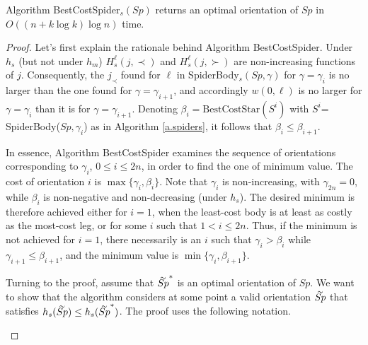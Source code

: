 \begin{theorem}
Algorithm BestCostSpider$_s (Sp)$ returns an optimal orientation of $Sp$ in $O((n + k \log k )\log n)$ time.
\end{theorem}
\begin{proof}
	Let's first explain the rationale behind Algorithm BestCostSpider.
	Under $h_s$ (but not under $h_m$) $H^{\ell}_s(j,\prec)$ and $H^{\ell}_s(j,\succ)$
	are non-increasing functions of $j$. Consequently,
	the $j_{\prec}$ found for $\ell$ in SpiderBody$_s (Sp,\gamma)$ for $\gamma=\gamma_i$
	is no larger than the one found for $\gamma=\gamma_{i+1}$, and 
	accordingly $w(0,\ell)$ is no larger for $\gamma=\gamma_i$
	than it is for $\gamma=\gamma_{i+1}$. Denoting 
	$\beta_i=\mbox{BestCostStar}(S^i)$ with $S^i$= SpiderBody($Sp,\gamma_i$)
	as in Algorithm \ref{a.spiders}, it follows that $\beta_i\leq \beta_{i+1}$.
	
	In essence, Algorithm BestCostSpider examines the sequence of orientations
	corresponding to $\gamma_i$, $0\leq i\leq 2n$, in order to
	find the one of minimum value. The cost of orientation $i$ is
    $\max\{\gamma_i,\beta_i\}$. Note that $\gamma_i$ is non-increasing,
    with $\gamma_{2n}=0$, while $\beta_i$ is non-negative and
    non-decreasing (under $h_s$). The desired minimum is therefore achieved either for $i=1$,
	when the least-cost body is at least as costly as the most-cost leg, or for some $i$
	such that $1< i \leq 2n$. 
Thus, if the minimum is not achieved for $i=1$, there necessarily is an $i$ such that 
$\gamma_i>\beta_i$ while $\gamma_{i+1}\leq \beta_{i+1}$, and the minimum value is 
$\min \{\gamma_i,\beta_{i+1}\}$.
	
Turning to the proof, assume that  $\tildeb{Sp}^*$ is an optimal orientation of $Sp$. 
We want to show that 
	the algorithm considers at some point a valid orientation $\tildeb{Sp}$ that satisfies 
	$h_s(\tildeb{Sp})\leq h_s(\tildeb{Sp}^*)$. The proof
	uses the following notation.
	\begin{itemize}


\end{itemize}
\end{proof}
